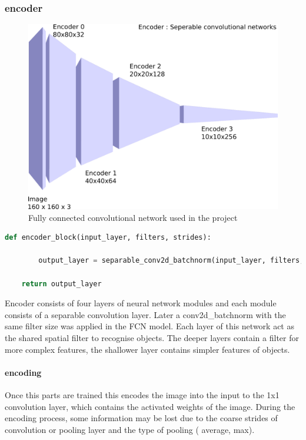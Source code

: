 \documentclass[paper=a4, fontsize=11pt]{scrartcl} %
\numberwithin{equation}{section} %
\numberwithin{figure}{section} %
\numberwithin{table}{section} %
\begin{document}
\subsubsection{encoder}\label{rubric11}
\begin{figure}[htp]
	\centering
	\includegraphics[scale=0.2]{./imgs/encoder.png}
	\caption{Fully connected convolutional network used in the project}
	\label{fig:encoder}
\end{figure}
\begin{lstlisting}[language=Python, caption= Endcoder block code]
	def encoder_block(input_layer, filters, strides):

		output_layer = separable_conv2d_batchnorm(input_layer, filters, strides)

    return output_layer
\end{lstlisting}
Encoder consists of four layers of neural network modules and each module consists of a separable convolution layer. Later a conv2d\_batchnorm with the same filter size was applied in the FCN model. Each layer of this network act as the shared spatial filter to recognise objects. The deeper layers contain a filter for more complex features, the shallower layer contains simpler features of objects. 
\paragraph{encoding} Once this parts are trained this encodes the image into the input to the 1x1 convolution layer, which contains the activated weights of the image. During the encoding process, some information may be lost due to the coarse strides of convolution or pooling layer and the type of pooling ( average, max).
\end{document}

